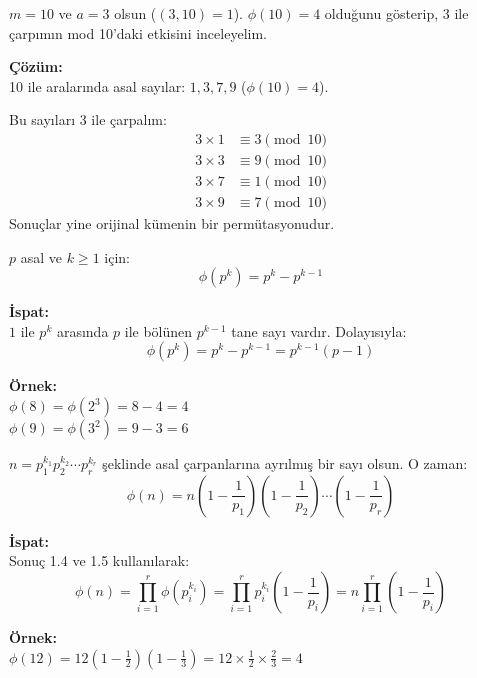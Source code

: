 \documentclass[12pt]{article}
\begin{document}
\vspace{2em}

\begin{tcolorbox}[colback=blue!5, colframe=blue!40!black, title=\textbf{Örnek 1.22: Mod 10'da Euler Fonksiyonu}, fonttitle=\bfseries, sharp corners]
$m = 10$ ve $a = 3$ olsun ($(3,10)=1$). $\phi(10)=4$ olduğunu gösterip, 3 ile çarpımın mod 10'daki etkisini inceleyelim.

\textbf{Çözüm:}\\
10 ile aralarında asal sayılar: $1,3,7,9$ ($\phi(10)=4$).

Bu sayıları 3 ile çarpalım:
\begin{align*}
3\times1 &\equiv3 \pmod{10} \\
3\times3 &\equiv9 \pmod{10} \\
3\times7 &\equiv1 \pmod{10} \\
3\times9 &\equiv7 \pmod{10}
\end{align*}
Sonuçlar yine orijinal kümenin bir permütasyonudur.
\end{tcolorbox}

\vspace{2em}

\begin{tcolorbox}[colback=orange!5, colframe=orange!50!black, title=\textbf{Sonuç 1.5: Euler Fonksiyonu ve Asal Kuvvetler}, fonttitle=\bfseries, sharp corners]
$p$ asal ve $k \geq 1$ için:
\[
\phi(p^k) = p^k - p^{k-1}
\]

\textbf{İspat:}\\
$1$ ile $p^k$ arasında $p$ ile bölünen $p^{k-1}$ tane sayı vardır. Dolayısıyla:
\[
\phi(p^k) = p^k - p^{k-1} = p^{k-1}(p-1)
\]

\textbf{\"Ornek:}\\
$\phi(8) = \phi(2^3) = 8-4 = 4$ \\
$\phi(9) = \phi(3^2) = 9-3 = 6$
\end{tcolorbox}

\vspace{2em}

\begin{tcolorbox}[colback=green!5, colframe=green!40!black, title=\textbf{Teorem 1.14: Euler Fonksiyonu Formülü}, fonttitle=\bfseries, sharp corners]
$n = p_1^{k_1}p_2^{k_2}\cdots p_r^{k_r}$ şeklinde asal çarpanlarına ayrılmış bir sayı olsun. O zaman:
\[
\phi(n) = n\left(1-\frac{1}{p_1}\right)\left(1-\frac{1}{p_2}\right)\cdots\left(1-\frac{1}{p_r}\right)
\]

\textbf{İspat:}\\
Sonuç 1.4 ve 1.5 kullanılarak:
\[
\phi(n) = \prod_{i=1}^r \phi(p_i^{k_i}) = \prod_{i=1}^r p_i^{k_i}\left(1-\frac{1}{p_i}\right) = n\prod_{i=1}^r \left(1-\frac{1}{p_i}\right)
\]

\textbf{\"Ornek:}\\
$\phi(12) = 12\left(1-\frac{1}{2}\right)\left(1-\frac{1}{3}\right) = 12\times\frac{1}{2}\times\frac{2}{3} = 4$
\end{tcolorbox}
\end{document}
